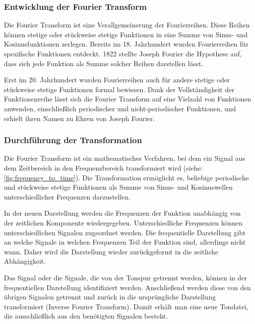 %
\subsubsection{Entwicklung der Fourier Transform}
%

Die Fourier Transform ist eine Verallgemeinerung der Fourierreihen. Diese Reihen können stetige oder stückweise stetige Funktionen in eine Summe von Sinus- und Kosinusfunktionen zerlegen. Bereits im 18. Jahrhundert wurden Fourierreihen für spezifische Funktionen entdeckt. 1822 stellte Joseph Fourier die Hypothese auf, dass sich jede Funktion als Summe solcher Reihen darstellen lässt.

\par

Erst im 20. Jahrhundert wurden Fourierreihen auch für andere stetige oder stückweise stetige Funktionen formal bewiesen. Dank der Vollständigkeit der Funktionenreihe lässt sich die Fourier Transform auf eine Vielzahl von Funktionen anwenden, einschließlich periodischer und nicht-periodischer Funktionen, und erhielt ihren Namen zu Ehren von Joseph Fourier.

%
\subsubsection{Durchführung der Transformation}
%

Die Fourier Transform ist ein mathematisches Verfahren, bei dem ein Signal aus dem Zeitbereich in den Frequenzbereich transformiert wird (siehe: \cref{fig:frequency_to_time}). Die Transformation ermöglicht es, beliebige periodische und stückweise stetige Funktionen als Summe von Sinus- und Kosinuswellen unterschiedlicher Frequenzen darzustellen.

\par

In der neuen Darstellung werden die Frequenzen der Funktion unabhängig von der zeitlichen Komponente wiedergegeben. Unterschiedliche Frequenzen können unterschiedlichen Signalen zugeordnet werden. Die frequentielle Darstellung gibt an welche Signale in welchen Frequenzen Teil der Funktion sind, allerdings nicht wann. Daher wird die Darstellung wieder zurückgeformt in die zeitliche Abhängigkeit.

\par

Das Signal oder die Signale, die von der Tonspur getrennt werden, können in der frequentiellen Darstellung identifiziert werden. Anschließend werden diese von den übrigen Signalen getrennt und zurück in die ursprüngliche Darstellung transformiert (Inverse Fourier Transform). Damit erhält man eine neue Tondatei, die ausschließlich aus den benötigten Signalen besteht.


